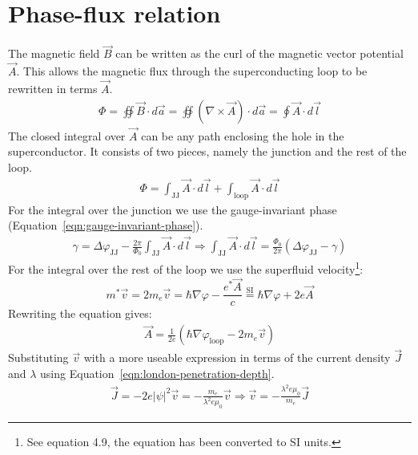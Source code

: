 \section{Phase-flux relation}
\label{app:derivation-phase-flux-relation}
The magnetic field $\vec{B}$ can be written as the curl of the magnetic vector potential $\vec{A}$. This allows the magnetic flux through the superconducting loop to be rewritten in terms $\vec{A}$.
\begin{align}
	\Phi = \oiint \vec{B} \cdot d\vec{a} = \oiint \left(\nabla \times \vec{A}\right) \cdot d\vec{a} = \oint \vec{A} \cdot d\vec{l}
\end{align}
The closed integral over $\vec{A}$ can be any path enclosing the hole in the superconductor. It consists of two pieces, namely the junction and the rest of the loop.
\begin{align}
	\Phi = \int_{\text{JJ}} \vec{A} \cdot d\vec{l} + \int_{\text{loop}} \vec{A} \cdot d\vec{l}
	\label{eqn:magnetic-potential-integral}
\end{align}
For the integral over the junction we use the gauge-invariant phase (Equation~\ref{eqn:gauge-invariant-phase}).
\begin{align}
	\gamma = \Delta\varphi_{\text{JJ}} - \frac{2\pi}{\Phi_0}\int_{\text{JJ}}\vec{A} \cdot d\vec{l} \Rightarrow \int_{\text{JJ}}\vec{A} \cdot d\vec{l} = \frac{\Phi_0}{2\pi} \left(\Delta\varphi_{\text{JJ}} - \gamma\right)
\end{align}
For the integral over the rest of the loop we use the superfluid velocity\footnote{See  equation 4.9, the equation has been converted to SI units.}:
\begin{equation}
	m^*\vec{v} = 2m_e\vec{v} = \hbar \nabla \varphi - \frac{e^*\vec{A}}{c} \stackrel{\text{SI}}{=} \hbar \nabla \varphi + 2e\vec{A}
	\label{eqn:superfluid-velocity}
\end{equation}
Rewriting the equation gives:
\begin{align}
	\vec{A} = \frac{1}{2e}\left(\hbar \nabla \varphi_{\text{loop}} - 2m_e\vec{v}\right)
\end{align}
Substituting $\vec{v}$ with a more useable expression in terms of the current density $\vec{J}$ and $\lambda$ using Equation~\ref{eqn:london-penetration-depth}.
\begin{align}
	\vec{J} = -2e|\psi|^2\vec{v} = -\frac{m_e}{\lambda^2e\mu_0}\vec{v} \Rightarrow \vec{v} = -\frac{\lambda^2e\mu_0}{m_e}\vec{J}
\end{align}
